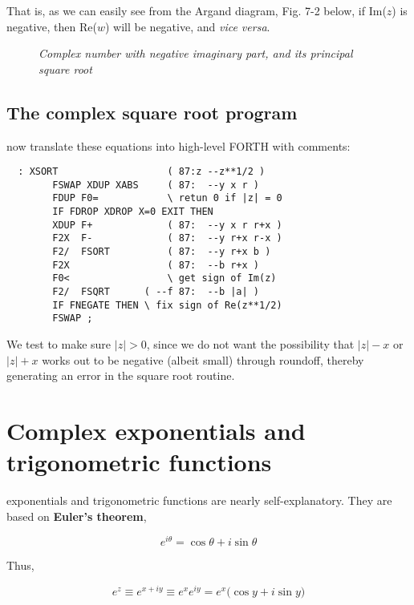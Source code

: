 That is, as we can easily see from the Argand diagram, Fig. 7-2 below, if Im($z$) is negative, then Re($w$) will be negative, and \textit{vice versa}.

\begin{figure}
    \center
    \caption{\textit{Complex number with negative imaginary part, and its principal square root}}
    \label{fig:07_02}
\end{figure}

\subsection{The complex square root program}
 now translate these equations into high-level FORTH with comments:

\begin{lstlisting}
  : XSORT                   ( 87:z --z**1/2 )
        FSWAP XDUP XABS     ( 87:  --y x r )
        FDUP F0=            \ retun 0 if |z| = 0
        IF FDROP XDROP X=0 EXIT THEN
        XDUP F+             ( 87:  --y x r r+x )
        F2X  F-             ( 87:  --y r+x r-x )
        F2/  FSORT          ( 87:  --y r+x b )
        F2X                 ( 87:  --b r+x )
        F0<                 \ get sign of Im(z)
        F2/  FSQRT      ( --f 87:  --b |a| )
        IF FNEGATE THEN \ fix sign of Re(z**1/2)
        FSWAP ;
\end{lstlisting}

We test to make sure $\lvert z \rvert > 0$, since we do not want the possibility that $\lvert z \rvert - x$ or $\lvert z \rvert + x$ works out to be negative (albeit small) through roundoff, thereby generating an error in the square root routine.

\section{Complex exponentials and trigonometric functions}
 exponentials and trigonometric functions are nearly self-explanatory. They are based on \textbf{Euler's theorem},

\begin{equation*}
  e^{i\theta} = \cos\theta + i \sin\theta
\end{equation*}

Thus,

\begin{equation}
  e^z \equiv e^{x + iy} \equiv e^x e^{iy} = e^x\big(\cos y + i \sin y\big)
\end{equation}

